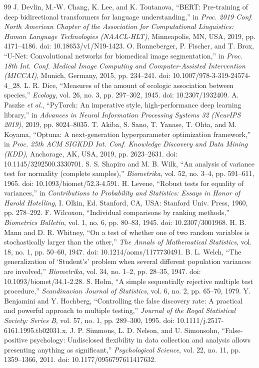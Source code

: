\documentclass[a4paper,12pt]{article}
\begin{document}
\begin{thebibliography}{99}
 J. Devlin, M.-W. Chang, K. Lee, and K. Toutanova, “BERT: Pre-training of deep bidirectional transformers for language understanding,” in \emph{Proc. 2019 Conf. North American Chapter of the Association for Computational Linguistics: Human Language Technologies (NAACL-HLT)}, Minneapolis, MN, USA, 2019, pp. 4171–4186. doi: 10.18653/v1/N19-1423.
 O. Ronneberger, P. Fischer, and T. Brox, “U-Net: Convolutional networks for biomedical image segmentation,” in \emph{Proc. 18th Int. Conf. Medical Image Computing and Computer-Assisted Intervention (MICCAI)}, Munich, Germany, 2015, pp. 234–241. doi: 10.1007/978-3-319-24574-4\_28.
 L. R. Dice, “Measures of the amount of ecologic association between species,” \emph{Ecology}, vol. 26, no. 3, pp. 297–302, 1945. doi: 10.2307/1932409.
 A. Paszke \emph{et al}., “PyTorch: An imperative style, high-performance deep learning library,” in \emph{Advances in Neural Information Processing Systems 32 (NeurIPS 2019)}, 2019, pp. 8024–8035.
 T. Akiba, S. Sano, T. Yanase, T. Ohta, and M. Koyama, “Optuna: A next-generation hyperparameter optimization framework,” in \emph{Proc. 25th ACM SIGKDD Int. Conf. Knowledge Discovery and Data Mining (KDD)}, Anchorage, AK, USA, 2019, pp. 2623–2631. doi: 10.1145/3292500.3330701.
 S. S. Shapiro and M. B. Wilk, “An analysis of variance test for normality (complete samples),” \emph{Biometrika}, vol. 52, no. 3–4, pp. 591–611, 1965. doi: 10.1093/biomet/52.3-4.591.
 H. Levene, “Robust tests for equality of variances,” in \emph{Contributions to Probability and Statistics: Essays in Honor of Harold Hotelling}, I. Olkin, Ed. Stanford, CA, USA: Stanford Univ. Press, 1960, pp. 278–292.
 F. Wilcoxon, “Individual comparisons by ranking methods,” \emph{Biometrics Bulletin}, vol. 1, no. 6, pp. 80–83, 1945. doi: 10.2307/3001968.
 H. B. Mann and D. R. Whitney, “On a test of whether one of two random variables is stochastically larger than the other,” \emph{The Annals of Mathematical Statistics}, vol. 18, no. 1, pp. 50–60, 1947. doi: 10.1214/aoms/1177730491.
 B. L. Welch, “The generalization of ‘Student’s’ problem when several different population variances are involved,” \emph{Biometrika}, vol. 34, no. 1–2, pp. 28–35, 1947. doi: 10.1093/biomet/34.1-2.28.
 S. Holm, “A simple sequentially rejective multiple test procedure,” \emph{Scandinavian Journal of Statistics}, vol. 6, no. 2, pp. 65–70, 1979.
 Y. Benjamini and Y. Hochberg, “Controlling the false discovery rate: A practical and powerful approach to multiple testing,” \emph{Journal of the Royal Statistical Society: Series B}, vol. 57, no. 1, pp. 289–300, 1995. doi: 10.1111/j.2517-6161.1995.tb02031.x.
 J. P. Simmons, L. D. Nelson, and U. Simonsohn, “False-positive psychology: Undisclosed flexibility in data collection and analysis allows presenting anything as significant,” \emph{Psychological Science}, vol. 22, no. 11, pp. 1359–1366, 2011. doi: 10.1177/0956797611417632.
\end{thebibliography}
\end{document}
